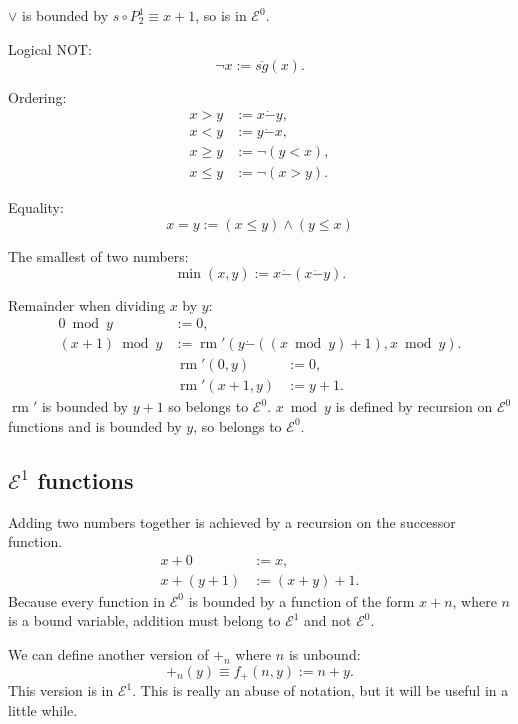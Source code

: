 \documentclass[a4paper]{article}
\newcommand{\grz}[1]{$\mathcal{E}^{#1}$}	%
\newcommand{\psub}{\dot -}	%
\newcommand{\rsg}{\overline{sg}} %
\newcommand{\recur}[1]{\begin{equation} \begin{split} #1 \end{split} \end{equation}}	%
\newcommand{\recurN}[1]{\begin{equation*} \begin{split} #1 \end{split} \end{equation*}}	%
\theoremstyle{plain}
\theoremstyle{definition}
\begin{document}
$\vee$ is bounded by $s \circ P_2^1 \equiv x+1$, so is in \grz{0}.

Logical NOT:
\begin{equation} \neg x := \rsg(x). \end{equation}

Ordering:
\begin{equation} \begin{split} 
	x > y &:= x \psub y, 	\\
	x < y &:= y \psub x, \\
	x \geq y &:= \neg (y<x),	\\
	x \leq y &:= \neg (x>y).
\end{split} \end{equation}

Equality:
\begin{equation} x=y := (x \leq y) \wedge (y \leq x) \end{equation}

The smallest of two numbers:
\begin{equation} \min(x,y) := x \psub ( x \psub y). \end{equation}

Remainder when dividing $x$ by $y$:
\recur{
	0 \bmod{y} &:= 0,	\\
	(x+1) \bmod{y} &:= \operatorname{rm}' \left( y \psub \left( (x \bmod{y}) + 1 \right), x \bmod{y} \right).
	}
\recurN{
	\operatorname{rm}'(0,y) &:= 0, 	\\
	\operatorname{rm}'(x+1,y) &:= y+1.
}
$\operatorname{rm}'$ is bounded by $y+1$ so belongs to \grz{0}. $x \bmod{y}$ is defined by recursion on \grz{0} functions and is bounded by $y$, so belongs to \grz{0}.

\subsection{\grz{1} functions}
Adding two numbers together is achieved by a recursion on the successor function.
\recur{
	x + 0 &:= x,			\\
	x + (y+1) &:= (x+y) + 1.
}
Because every function in \grz{0} is bounded by a function of the form $x+n$, where $n$ is a bound variable, addition must belong to \grz{1} and not \grz{0}.

We can define another version of $+_n$ where $n$ is unbound:
\begin{equation} +_n(y) \equiv f_{+}(n,y) := n + y. \end{equation}
This version is in \grz{1}. This is really an abuse of notation, but it will be useful in a little while.
\end{document}
